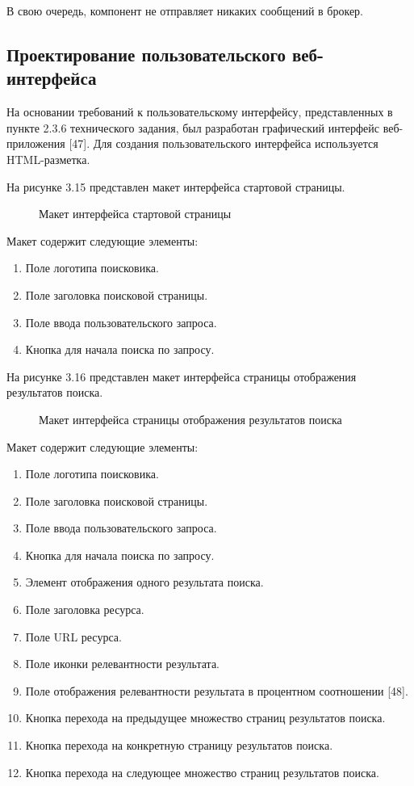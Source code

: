 В свою очередь, компонент не отправляет никаких сообщений в брокер.

\subsection{Проектирование пользовательского веб-интерфейса}

На основании требований к пользовательскому интерфейсу, представленных в пункте 2.3.6 технического задания, был разработан графический интерфейс веб-приложения [47]. Для создания пользовательского интерфейса используется HTML-разметка.

На рисунке 3.15 представлен макет интерфейса стартовой страницы.
\begin{figure}[H]
\caption{Макет интерфейса стартовой страницы}
\label{web/main.png:image}
\end{figure}
Макет содержит следующие элементы:
\begin{enumerate}
\item Поле логотипа поисковика.
\item Поле заголовка поисковой страницы.
\item Поле ввода пользовательского запроса.
\item Кнопка для начала поиска по запросу.
\end{enumerate}

На рисунке 3.16 представлен макет интерфейса страницы отображения результатов поиска.
\begin{figure}[H]
\caption{Макет интерфейса страницы отображения результатов поиска}
\label{web/results.png:image}
\end{figure}
Макет содержит следующие элементы:
\begin{enumerate}
\item Поле логотипа поисковика.
\item Поле заголовка поисковой страницы.
\item Поле ввода пользовательского запроса.
\item Кнопка для начала поиска по запросу.
\item Элемент отображения одного результата поиска.
\item Поле заголовка ресурса.
\item Поле URL ресурса.
\item Поле иконки релевантности результата.
\item Поле отображения релевантности результата в процентном соотношении [48].
\item Кнопка перехода на предыдущее множество страниц результатов поиска.
\item Кнопка перехода на конкретную страницу результатов поиска.
\item Кнопка перехода на следующее множество страниц результатов поиска.
\end{enumerate}